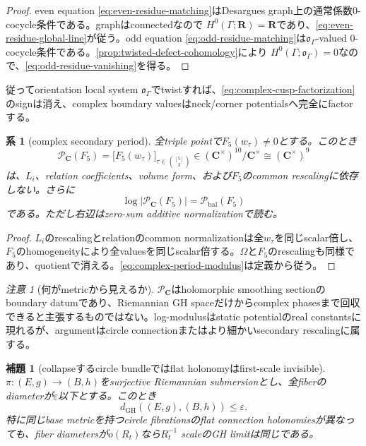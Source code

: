 \documentclass[11pt,a4paper]{ltjsarticle}
\newtheorem{lemma}[theorem]{補題}
\newtheorem{corollary}[theorem]{系}
\theoremstyle{definition}
\theoremstyle{remark}
\newtheorem{remark}[theorem]{注意}
\newcommand{\CC}{\mathbf C}
\newcommand{\RR}{\mathbf R}
\newcommand{\GH}{\mathrm{GH}}
\newcommand{\eps}{\varepsilon}
\begin{document}
\begin{proof}
even equation \eqref{eq:even-residue-matching}はDesargues graph上の通常係数$0$-cocycle条件である。graphはconnectedなので
$H^0(\Gamma;\RR)=\RR$であり、\eqref{eq:even-residue-global-line}が従う。odd equation \eqref{eq:odd-residue-matching}は$\mathfrak o_\Gamma$-valued $0$-cocycle条件である。\cref{prop:twisted-defect-cohomology}により
$H^0(\Gamma;\mathfrak o_\Gamma)=0$なので、\eqref{eq:odd-residue-vanishing}を得る。
\end{proof}

従ってorientation local system $\mathfrak o_\Gamma$でtwistすれば、\eqref{eq:complex-cusp-factorization}のsignは消え、complex boundary valuesはneck/corner potentialsへ完全にfactorする。

\begin{corollary}[complex secondary period]\label{cor:complex-secondary-period}
全triple pointで$F_5(w_\tau)\ne0$とする。このとき
\begin{equation}\label{eq:complex-secondary-period}
 \mathcal P_{\CC}(F_5)
 =\bigl[F_5(w_\tau)\bigr]_{\tau\in\binom{[5]}3}
 \in(\CC^\times)^{10}/\CC^\times
 \cong(\CC^\times)^9
\end{equation}
は、$L_i$、relation coefficients、volume form、および$F_5$のcommon rescalingに依存しない。さらに
\begin{equation}\label{eq:complex-period-modulus}
 \log|\mathcal P_{\CC}(F_5)|
 =\mathcal P_{\mathrm{bal}}(F_5)
\end{equation}
である。ただし右辺はzero-sum additive normalizationで読む。
\end{corollary}

\begin{proof}
$L_i$のrescalingとrelationのcommon normalizationは全$w_\tau$を同じscalar倍し、$F_5$のhomogeneityにより全valuesを同じscalar倍する。$\Omega$と$F_5$のrescalingも同様であり、quotientで消える。\eqref{eq:complex-period-modulus}は定義から従う。
\end{proof}

\begin{remark}[何がmetricから見えるか]
$\mathcal P_{\CC}$はholomorphic smoothing sectionのboundary datumであり、Riemannian GH spaceだけからcomplex phasesまで回収できると主張するものではない。log-modulusはstatic potentialのreal constantsに現れるが、argumentはcircle connectionまたはより細かいsecondary rescalingに属する。
\end{remark}

\begin{lemma}[collapseするcircle bundleではflat holonomyはfirst-scale invisible]\label{lem:circle-holonomy-invisible}
$\pi:(E,g)\to(B,h)$をsurjective Riemannian submersionとし、全fiberのdiameterが$\eps$以下とする。このとき
\begin{equation}\label{eq:submersion-gh-bound}
 d_{\GH}((E,g),(B,h))\le\eps.
\end{equation}
特に同じbase metricを持つcircle fibrationsのflat connection holonomiesが異なっても、fiber diametersが$o(R_t)$なら$R_t^{-1}$ scaleのGH limitは同じである。
\end{lemma}
\end{document}
